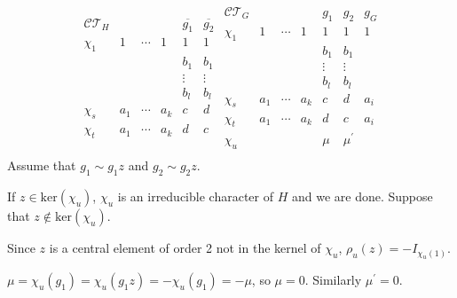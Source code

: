 \documentclass[xcolor=dvipsnames]{beamer}
\theoremstyle{remark}
\theoremstyle{plain}
\theoremstyle{definition}
\begin{document}
\begin{frame}
\[
\begin{array}{ccccccc}
  \mathcal{CT}_H       &   &        &       & \overline{g_1} & \overline{g_2}\\
  \chi_1 & 1 & \cdots &   1 & 1              & 1\\
         &   &   &             & b_1            & b_1\\
         &   &   &             & \vdots         & \vdots\\
         &   &   &             & b_l            & b_l\\
  \chi_s & a_1 &\cdots & a_k & c & d\\
  \chi_t & a_1 &\cdots & a_k & d & c\\
\end{array}
\begin{array}{|ccccccc}
  \mathcal{CT}_G         &   &       &       & g_1 & g_2 & g_G\\
  \chi_1 & 1 & \cdots  & 1 & 1              & 1 & 1\\
         &   &   &             & b_1            & b_1 &\\
         &   &   &             & \vdots         & \vdots&\\
         &   &   &             & b_l            & b_l&\\
  \chi_s & a_1 &\cdots  & a_k & c & d &a_i\\
  \chi_t & a_1 &\cdots  & a_k & d & c &a_i\\
  \chi_u &     &        &    & \mu & \mu^{\prime} &\\ 
\end{array}
\]
\pause
Assume that $g_1\sim g_1z$ and $g_2\sim g_2z$.\pause\vspace{.2cm}

If $z\in\mathrm{ker}(\chi_u)$, $\chi_u$ is an irreducible character of
$H$ and we are done. Suppose that $z\notin\mathrm{ker}(\chi_u)$.\pause\vspace{.2cm}

Since $z$ is a central element of order 2 not in the kernel of $\chi_u$,
$\rho_u(z)=-I_{\chi_{u}(1)}$.\pause\vspace{.2cm}

$\mu=\chi_u(g_1)=\chi_u(g_1z)=-\chi_u(g_1)=-\mu$, so
$\mu=0$. Similarly $\mu^{\prime}=0$. \vspace{.2cm}

\end{frame}
\end{document}
